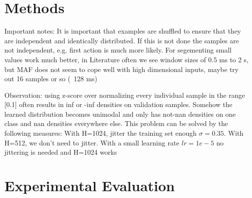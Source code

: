 \documentclass[11pt,titlepage,oneside,openany]{book}
\renewcommand{\algorithmiccomment}[1]{\ensuremath{\rhd} \textit{#1}}
\def\MYCALL#1#2{{\small\textsc{#1}}(\textup{#2})}
\def\MYNOT{\textbf{ not }}
\def\MYBREAK{\textbf{break }}
\def\MYNIL{\textsc{Nil}}
\def\ONT{{\mathcal O}} %
\def\ALI{{\mathcal A}} %
\begin{document}
\chapter{Methods}
\label{cha:alg}

Important notes:
It is important that examples are shuffled to ensure that they are independent and identically distributed. If this is not done the samples are not independent, e.g. first action is much more likely.
For segementing small values work much better, in Literature often we see window sizes of 0.5 ms to 2 s, but MAF does not seem to cope well with high dimensional inputs, maybe try out 16 samples or so (~128 ms)

Observation: using z-score over normalizing every individual sample in the range [0.1] often results in inf or -inf densities on validation samples. Somehow the learned distribution becomes unimodal and only has not-nan densities on one class and nan densities everywhere else. This problem can be solved by the following measures: With H=1024, jitter the training set enough $\sigma=0.35$. With H=512, we don't need to jitter. With a small learning rate $lr=1e-5$ no jittering is needed and H=1024 works

\chapter{Experimental Evaluation}
\label{cha:exp}
\end{document}
